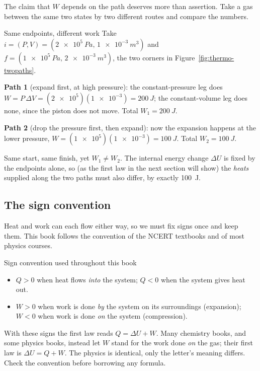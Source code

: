 The claim that $W$ depends on the path deserves more than assertion. Take a gas between the same two
states by two different routes and compare the numbers.

\begin{figure}[htbp]
\centering
{}
\end{figure}

\begin{derivbox}{Same endpoints, different work}\label{der:thermo-twopaths}
Take $i=(P,V)=(\SI{2e5}{Pa},\,\SI{1e-3}{m^3})$ and $f=(\SI{1e5}{Pa},\,\SI{2e-3}{m^3})$, the two corners
in Figure~\ref{fig:thermo-twopaths}.

 \textbf{Path 1} (expand first, at high pressure): the constant-pressure leg does
$W=P\,\Delta V=(\num{2e5})(\num{1e-3})=\SI{200}{J}$; the constant-volume leg does none, since the piston
does not move. Total $W_1=\SI{200}{J}$.

 \textbf{Path 2} (drop the pressure first, then expand): now the expansion happens at the lower
pressure, $W=(\num{1e5})(\num{1e-3})=\SI{100}{J}$. Total $W_2=\SI{100}{J}$.

 Same start, same finish, yet $W_1\neq W_2$. The internal energy change $\Delta U$ is fixed by the
endpoints alone, so (as the first law in the next section will show) the \emph{heats} supplied along the
two paths must also differ, by exactly \SI{100}{J}.
\end{derivbox}

\subsection{The sign convention}

Heat and work can each flow either way, so we must fix signs once and keep them. This book follows the
convention of the NCERT textbooks and of most physics courses.

\begin{keybox}{Sign convention used throughout this book}\label{key:thermo-signs}
\begin{itemize}
\item $Q>0$ when heat flows \emph{into} the system; $Q<0$ when the system gives heat out.
\item $W>0$ when work is done \emph{by} the system on its surroundings (expansion); $W<0$ when work is done
      \emph{on} the system (compression).
\end{itemize}
With these signs the first law reads $Q=\Delta U+W$. Many chemistry books, and some physics books,
instead let $W$ stand for the work done \emph{on} the gas; their first law is $\Delta U=Q+W$. The physics is
identical, only the letter's meaning differs. Check the convention before borrowing any formula.
\end{keybox}

